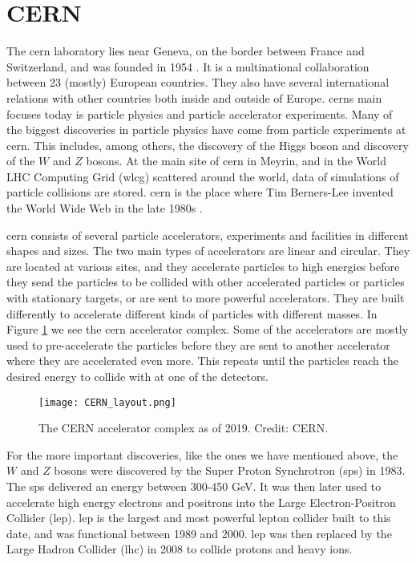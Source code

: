 \documentclass[a4paper, american, 12pt]{report}
\begin{document}

	\section{CERN}
	\label{sect:Theory-CERN}
	The \acrshort{cern} laboratory lies near Geneva, on the border between France and Switzerland, and was founded in 1954 \cite{AboutCERN}. It is a multinational collaboration between 23 (mostly) European countries. They also have several international relations with other countries both inside and outside of Europe. \acrshort{cern}s main focuses today is particle physics and particle accelerator experiments. Many of the biggest discoveries in particle physics have come from particle experiments at \acrshort{cern}. This includes, among others, the discovery of the Higgs boson and discovery of the $W$ and $Z$ bosons. At the main site of \acrshort{cern} in Meyrin, and in the World LHC Computing Grid (\acrshort{wlcg}) scattered around the world, data of simulations of particle collisions are stored. \acrshort{cern} is the place where Tim Berners-Lee invented the World Wide Web in the late 1980s \cite{mcpherson2009WWW}.
	
	\acrshort{cern} consists of several particle accelerators, experiments and facilities in different shapes and sizes. The two main types of accelerators are linear and circular. They are located at various sites, and they accelerate particles to high energies before they send the particles to be collided with other accelerated particles or particles with stationary targets, or are sent to more powerful accelerators. They are built differently to accelerate different kinds of particles with different masses. In Figure \ref{fig:CERN_Layout} we see the \acrshort{cern} accelerator complex. Some of the accelerators are mostly used to pre-accelerate the particles before they are sent to another accelerator where they are accelerated even more. This repeats until the particles reach the desired energy to collide with at one of the detectors.
	\begin{figure}[htbp!]
		\centering\texttt{[image: CERN\_layout.png]}
		\caption[The CERN complex.]{The CERN accelerator complex as of 2019. Credit: CERN\cite{MobsCERNLayout}.\label{fig:CERN_Layout}}
	\end{figure} 

	For the more important discoveries, like the ones we have mentioned above, the $W$ and $Z$ bosons were discovered by the Super Proton Synchrotron (\acrshort{sps}) in 1983. The \acrshort{sps} delivered an energy between 300-450 GeV. It was then later used to accelerate high energy electrons and positrons into the Large Electron-Positron Collider (\acrshort{lep}). \acrshort{lep} is the largest and most powerful lepton collider built to this date, and was functional between 1989 and 2000. \acrshort{lep} was then replaced by the Large Hadron Collider (\acrshort{lhc}) in 2008 to collide protons and heavy ions. 
	
\end{document}
